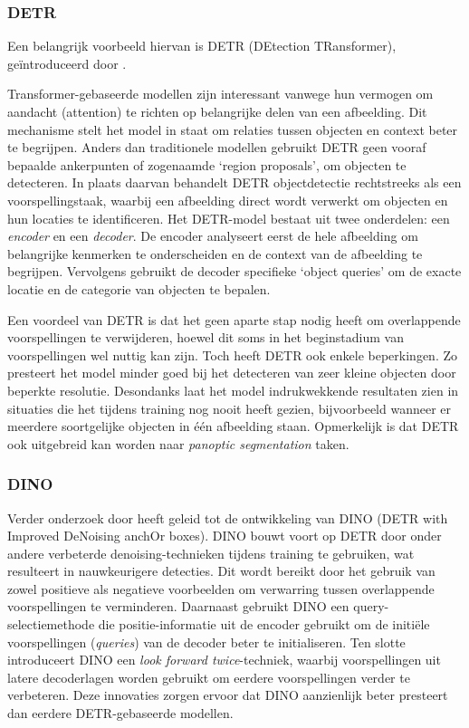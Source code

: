 \subsubsection{DETR}

Een belangrijk voorbeeld hiervan is DETR (DEtection TRansformer), geïntroduceerd door \textcite{Carion2020}.

Transformer-gebaseerde modellen zijn interessant vanwege hun vermogen om aandacht (attention) te richten op belangrijke delen van een afbeelding. 
Dit mechanisme stelt het model in staat om relaties tussen objecten en context beter te begrijpen.
Anders dan traditionele modellen gebruikt DETR geen vooraf bepaalde ankerpunten of zogenaamde `region proposals', om objecten te detecteren. 
In plaats daarvan behandelt DETR objectdetectie rechtstreeks als een voorspellingstaak, waarbij een afbeelding direct wordt verwerkt om objecten en hun locaties te identificeren.
Het DETR-model bestaat uit twee onderdelen: een \textit{encoder} en een \textit{decoder}. De encoder analyseert eerst de hele afbeelding om belangrijke kenmerken te onderscheiden en de context van de afbeelding te begrijpen. 
Vervolgens gebruikt de decoder specifieke `object queries' om de exacte locatie en de categorie van objecten te bepalen.

Een voordeel van DETR is dat het geen aparte stap nodig heeft om overlappende voorspellingen te verwijderen, hoewel dit soms in het beginstadium van voorspellingen wel nuttig kan zijn.
Toch heeft DETR ook enkele beperkingen. Zo presteert het model minder goed bij het detecteren van zeer kleine objecten door beperkte resolutie. 
Desondanks laat het model indrukwekkende resultaten zien in situaties die het tijdens training nog nooit heeft gezien, bijvoorbeeld wanneer er meerdere soortgelijke objecten in één afbeelding staan.
Opmerkelijk is dat DETR ook uitgebreid kan worden naar \textit{panoptic segmentation} taken.

\subsubsection{DINO}

Verder onderzoek door \textcite{Zhang2022} heeft geleid tot de ontwikkeling van DINO (DETR with Improved DeNoising anchOr boxes). 
DINO bouwt voort op DETR door onder andere verbeterde denoising-technieken tijdens training te gebruiken, wat resulteert in nauwkeurigere detecties. 
Dit wordt bereikt door het gebruik van zowel positieve als negatieve voorbeelden om verwarring tussen overlappende voorspellingen te verminderen. 
Daarnaast gebruikt DINO een query-selectiemethode die positie-informatie uit de encoder gebruikt om de initiële voorspellingen (\textit{queries}) van de decoder beter te initialiseren. 
Ten slotte introduceert DINO een \textit{look forward twice}-techniek, waarbij voorspellingen uit latere decoderlagen worden gebruikt om eerdere voorspellingen verder te verbeteren. 
Deze innovaties zorgen ervoor dat DINO aanzienlijk beter presteert dan eerdere DETR-gebaseerde modellen.

